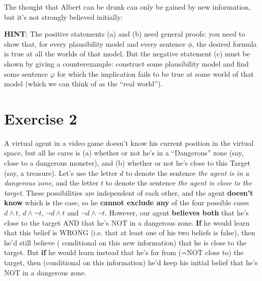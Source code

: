 \documentclass[leqno]{article}
\begin{document}
The thought that Albert can be drunk can only be gained by new information, but
it's not strongly believed initially:

\begin{center}
\end{center}

\textbf{HINT}: The positive statements (a) and (b) need general proofs: you
need to show that, for every plausibility model and every sentence $\phi$, the
desired formula is true at all the worlds of that model. But the negative
statement (c) must be shown by giving a counterexample: construct some
plausibility model and find some sentence $\varphi$ for which the implication
fails to be true at some world of that model (which we can think of as the
“real world”).

\section*{Exercise 2}

A virtual agent in a video game doesn't know his current position in the 
virtual space, but all he cares is (a) whether or not he's in a ``Dangerous''
zone (say, close to a dangerous monster), and (b) whether or not he's close to 
this Target (say, a treasure). Let's use the letter $d$ to denote the sentence 
\textit{the agent is in a dangerous zone}, and the letter $t$ to denote the 
sentence \textit{the agent is close to the target}. These possibilities are 
independent of each other, and the agent \textbf{doesn't know} which is the 
case, so he \textbf{cannot exclude any} of the four possible cases $d \land t$,
 $d \land \neg t$, $\neg d \land t$ and $\neg d \land \neg t$. However, our 
agent \textbf{believes both} that he's close to the target AND that he's NOT in
 a dangerous zone. \textbf{If} he would learn that this belief is WRONG (i.e. 
that at least one of his two beliefs is false), then he'd still believe (
conditional on this new information) that he is close to the target. But 
\textbf{if} he would learn instead that he's far from (=NOT close to) the 
target, then (conditional on this information) he'd keep his initial belief 
that he's NOT in a dangerous zone.
\end{document}
